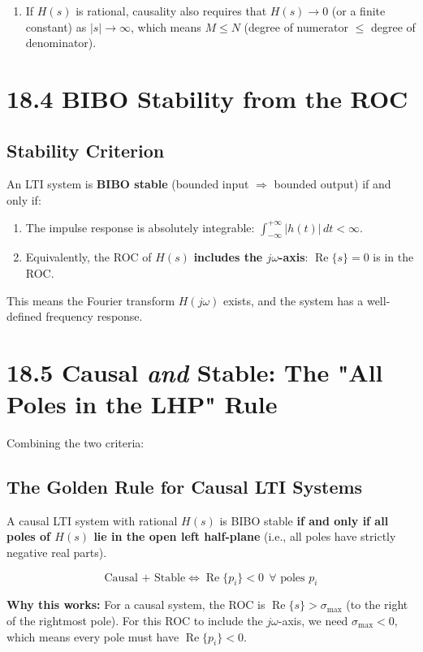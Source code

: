 \documentclass[11pt]{article}
\begin{document}
\begin{enumerate}
  \item If $H(s)$ is rational, causality also requires that $H(s) \to 0$ (or a finite constant) as $|s| \to \infty$, which means $M \leq N$ (degree of numerator $\leq$ degree of denominator).
\end{enumerate}

\section*{18.4 BIBO Stability from the ROC}

\subsection*{Stability Criterion}

An LTI system is \textbf{BIBO stable} (bounded input $\Rightarrow$ bounded output) if and only if:

\begin{enumerate}
  \item The impulse response is absolutely integrable: $\displaystyle\int_{-\infty}^{+\infty} |h(t)|\, dt < \infty$.
  \item Equivalently, the ROC of $H(s)$ \textbf{includes the $j\omega$-axis}: $\operatorname{Re}\{s\} = 0$ is in the ROC.
\end{enumerate}

This means the Fourier transform $H(j\omega)$ exists, and the system has a well-defined frequency response.

\section*{18.5 Causal \textit{and} Stable: The "All Poles in the LHP" Rule}

Combining the two criteria:

\subsection*{The Golden Rule for Causal LTI Systems}

A causal LTI system with rational $H(s)$ is BIBO stable \textbf{if and only if all poles of $H(s)$ lie in the open left half-plane} (i.e., all poles have strictly negative real parts).

\[\text{Causal + Stable} \iff \operatorname{Re}\{p_i\} < 0 \ \ \forall \text{ poles } p_i\]

\textbf{Why this works:} For a causal system, the ROC is $\operatorname{Re}\{s\} > \sigma_{\max}$ (to the right of the rightmost pole). For this ROC to include the $j\omega$-axis, we need $\sigma_{\max} < 0$, which means every pole must have $\operatorname{Re}\{p_i\} < 0$.
\end{document}
